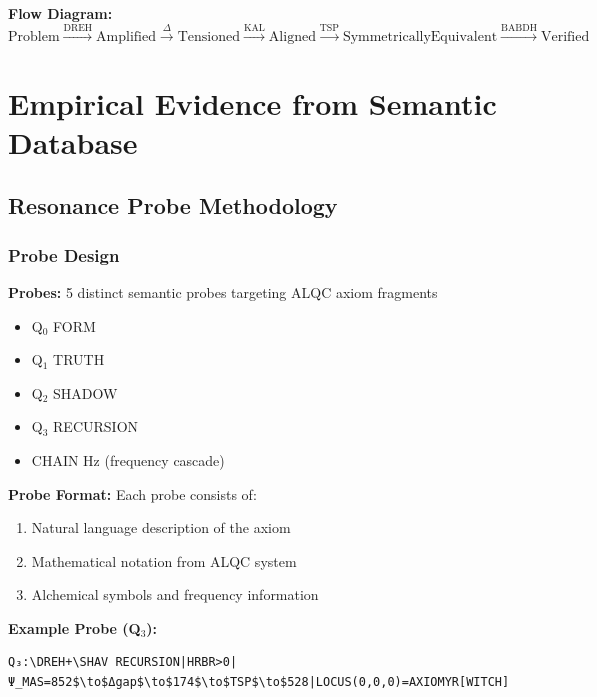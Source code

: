 \documentclass[11pt, letterpaper]{article}
\newcommand{\DREH}{\ensuremath{\mathop{\textnormal{\symbolafont\symbol{"29D7}}}}}   %
\newcommand{\SHAV}{\ensuremath{\mathop{\textnormal{\symbolafont\symbol{"269B}}}}}   %
\def\DREH{DREH}%
\def\SHAV{SHAV}%
\begin{document}
\textbf{Flow Diagram:}
\begin{equation}
\text{Problem} \xrightarrow{\text{DREH}} \text{Amplified} \xrightarrow{\Delta} \text{Tensioned} \xrightarrow{\text{KAL}} \text{Aligned} \xrightarrow{\text{TSP}} \text{SymmetricallyEquivalent} \xrightarrow{\text{BABDH}} \text{Verified}
\end{equation}

\section{Empirical Evidence from Semantic Database}

\subsection{Resonance Probe Methodology}

\subsubsection{Probe Design}

\textbf{Probes:} 5 distinct semantic probes targeting ALQC axiom fragments
\begin{itemize}
    \item Q$_0$ FORM
    \item Q$_1$ TRUTH
    \item Q$_2$ SHADOW
    \item Q$_3$ RECURSION
    \item CHAIN Hz (frequency cascade)
\end{itemize}

\textbf{Probe Format:} Each probe consists of:
\begin{enumerate}
    \item Natural language description of the axiom
    \item Mathematical notation from ALQC system
    \item Alchemical symbols and frequency information
\end{enumerate}

\textbf{Example Probe (Q$_3$):}
\begin{verbatim}
Q₃:\DREH+\SHAV RECURSION|HRBR>0|Ψ_MAS=852$\to$Δgap$\to$174$\to$TSP$\to$528|LOCUS(0,0,0)=AXIOMYR[WITCH]
\end{verbatim}
\end{document}
